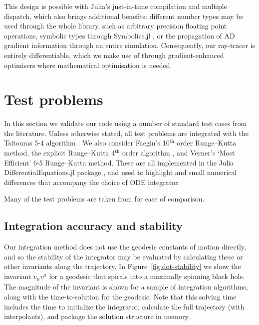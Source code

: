 \documentclass[fleqn,usenatbib]{mnras}
\begin{document}
This design is possible with Julia's just-in-time compilation and multiple
dispatch, which also brings additional benefits: different number types may be used
through the whole library, such as arbitrary precision floating point
operations, symbolic types through Symbolics.jl \citep{symbolics_julia}, or the
propagation of AD gradient information through an entire simulation.
Consequently, our ray-tracer is entirely differentiable, which we make use of
through gradient-enhanced optimisers where mathematical optimisation is needed.

\section{Test problems}
\label{sec:test-problems}

In this section we validate our code using a number of standard test cases from
the literature. Unless otherwise stated, all test problems are integrated with
the Tsitouras 5-4 algorithm \citep{tsitouras_rungekutta_2011}. We also consider
Faegin's 10$^\text{th}$ order Runge--Kutta method, the explicit Runge--Kutta
4$^\text{th}$ order algorithm \citep{press_numerical_2007}, and Verner's `Most
Efficient' 6-5 Runge--Kutta method.  These are all implemented in the Julia
DifferentialEquations.jl package \citep{rackauckas_differential_2017}, and used
to highlight and small numerical differences that accompany the choice of ODE
integrator.

Many of the test problems are taken from \citet{gold_verification_2020} for ease
of comparison.

\subsection{Integration accuracy and stability}

Our integration method does not use the geodesic constants of motion directly,
and so the stability of the integrator may be evaluated by calculating these or
other invariants along the trajectory. In Figure~\ref{fig:dot-stability} we show
the invariant $v_\mu v^\mu$ for a geodesic that spirals into a maximally
spinning black hole. The magnitude of the invariant is shown for a sample of
integration algorithms, along with the time-to-solution for the geodesic. Note
that this solving time includes the time to initialize the integrator, calculate
the full trajectory (with interpolants), and package the solution structure in
memory.
\end{document}
